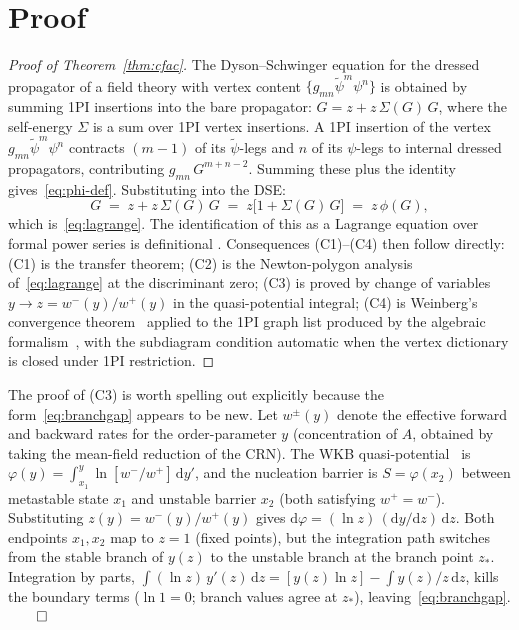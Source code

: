 \documentclass[11pt,a4paper]{article}
\newcommand{\dd}{\mathrm{d}}
\newcommand{\psit}{\tilde\psi}
\theoremstyle{plain}
\theoremstyle{definition}
\begin{document}
\section{Proof}
\label{sec:proof}

\begin{proof}[Proof of Theorem~\ref{thm:cfac}]
The Dyson--Schwinger equation for the dressed propagator of a
field theory with vertex content $\{g_{m n}\psit^{m}\psi^{n}\}$
is obtained by summing 1PI insertions into the bare propagator:
$G = z + z\,\Sigma(G)\,G$, where the self-energy $\Sigma$ is a
sum over 1PI vertex insertions.  A 1PI insertion of the vertex
$g_{m n}\psit^{m}\psi^{n}$ contracts $(m{-}1)$ of its $\psit$-legs
and $n$ of its $\psi$-legs to internal dressed propagators,
contributing $g_{m n}\,G^{m+n-2}$.  Summing these plus the
identity gives~\eqref{eq:phi-def}.  Substituting into the DSE:
\[
  G \;=\; z + z\,\Sigma(G)\,G
    \;=\; z\bigl[1 + \Sigma(G)\,G\bigr]
    \;=\; z\,\phi(G),
\]
which is~\eqref{eq:lagrange}.  The identification of this as a
Lagrange equation over formal power series is definitional
\citep[Ch.~VII]{FlajoletSedgewick}.  Consequences (C1)--(C4)
then follow directly: (C1) is the transfer theorem; (C2) is the
Newton-polygon analysis of~\eqref{eq:lagrange} at the
discriminant zero; (C3) is proved by change of variables $y \to z
= w^-(y)/w^+(y)$ in the quasi-potential integral; (C4) is
Weinberg's convergence theorem~\citep{Weinberg1960,Zimmermann1969}
applied to the 1PI graph list produced by the algebraic
formalism~\citep{Amarteifio2019Thesis}, with the subdiagram
condition automatic when the vertex dictionary is closed under
1PI restriction.
\end{proof}

The proof of (C3) is worth spelling out explicitly because the
form~\eqref{eq:branchgap} appears to be new.  Let $w^{\pm}(y)$
denote the effective forward and backward rates for the
order-parameter $y$ (concentration of $A$, obtained by taking the
mean-field reduction of the CRN).  The WKB
quasi-potential~\citep{FreidlinWentzell,ElgartKamenev,Meerson} is
$\varphi(y) = \int_{x_1}^{y}\ln[w^-/w^+]\,\dd y'$, and the
nucleation barrier is $S = \varphi(x_2)$ between metastable state
$x_1$ and unstable barrier $x_2$ (both satisfying $w^+ = w^-$).
Substituting $z(y) = w^-(y)/w^+(y)$ gives
$\dd\varphi = (\ln z)\,(\dd y/\dd z)\,\dd z$.  Both
endpoints $x_1, x_2$ map to $z = 1$ (fixed points), but the
integration path switches from the stable branch of $y(z)$ to the
unstable branch at the branch point $z_*$.  Integration by parts,
$\int (\ln z)\,y'(z)\,\dd z = [y(z)\ln z] - \int y(z)/z\,\dd z$,
kills the boundary terms ($\ln 1 = 0$; branch values agree at
$z_*$), leaving~\eqref{eq:branchgap}. $\qed$
\end{document}
